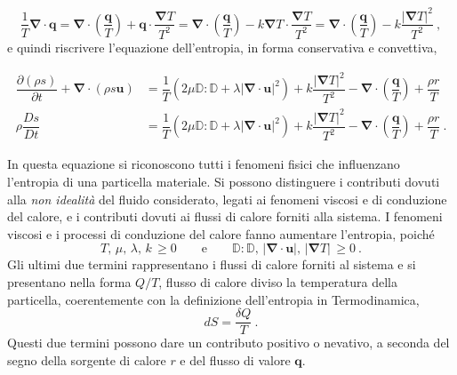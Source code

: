 \begin{equation}
 \dfrac{1}{T} \bm{\nabla} \cdot \bm{q} =
  \bm{\nabla} \cdot \left( \dfrac{\bm{q}}{T} \right) + \bm{q} \cdot \dfrac{\bm{\nabla} T}{T^2} =
  \bm{\nabla} \cdot \left( \dfrac{\bm{q}}{T} \right) - k \bm{\nabla}{T} \cdot \dfrac{\bm{\nabla} T}{T^2} =
  \bm{\nabla} \cdot \left( \dfrac{\bm{q}}{T} \right) - k \dfrac{|\bm{\nabla} T|^2}{T^2} \ ,
\end{equation}
e quindi riscrivere l'equazione dell'entropia, in forma conservativa e convettiva,
\begin{fBox}
\begin{equation}
\begin{aligned}
 \dfrac{\partial (\rho s)}{\partial t} + \bm{\nabla} \cdot (\rho s \bm{u} ) & = \dfrac{1}{T} \left( 2 \mu \mathbb{D} : \mathbb{D} + \lambda |\bm{\nabla} \cdot \bm{u}|^2 \right) + k \dfrac{|\bm{\nabla}T|^2}{T^2} - \bm{\nabla} \cdot \left( \dfrac{\bm{q}}{T} \right) + \dfrac{\rho r}{T} \\
 \rho \dfrac{D s}{D t} & = \dfrac{1}{T} \left( 2 \mu \mathbb{D} : \mathbb{D} + \lambda |\bm{\nabla} \cdot \bm{u}|^2 \right) + k \dfrac{|\bm{\nabla}T|^2}{T^2} - \bm{\nabla} \cdot \left( \dfrac{\bm{q}}{T} \right) + \dfrac{\rho r}{T}  \ .
\end{aligned}
\end{equation}
\end{fBox}
In questa equazione si riconoscono tutti i fenomeni fisici che influenzano l'entropia di una particella materiale. Si possono distinguere i contributi dovuti alla \textit{non idealità} del fluido considerato, legati ai fenomeni viscosi e di conduzione del calore, e i contributi dovuti ai flussi di calore forniti alla sistema. I fenomeni viscosi e i processi di conduzione del calore fanno aumentare l'entropia, poiché
\begin{equation}
 T, \, \mu, \, \lambda, \, k \, \geq 0
 \qquad \text{e} \qquad
 \mathbb{D}:\mathbb{D}, \, |\bm{\nabla} \cdot \bm{u}|, \, |\bm{\nabla} T| \, \geq 0 \ .
\end{equation}
Gli ultimi due termini rappresentano i flussi di calore forniti al sistema e si presentano nella forma $Q/T$, flusso di calore diviso la temperatura della particella, coerentemente con la definizione dell'entropia in Termodinamica,
\begin{equation}
 dS = \dfrac{\delta Q}{T} \ .
\end{equation}
Questi due termini possono dare un contributo positivo o nevativo, a seconda del segno della sorgente di calore $r$  e del flusso di valore $\bm{q}$.
